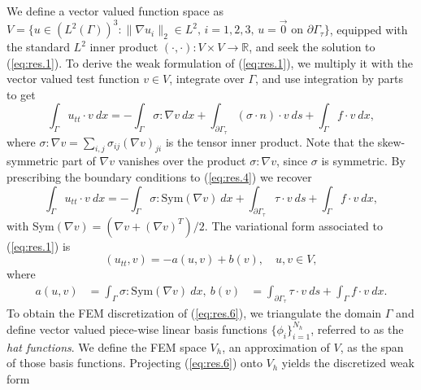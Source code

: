 We define a vector valued function space as $V = \{ u \in (L^2(\Gamma))^3 : \| \nabla u_i \|_2 \in L^2 \text{, } i=1,2,3\text{, } u = \vec 0 \text{ on } \partial \Gamma_\tau \}$, equipped with the standard $L^2$ inner product $(\cdot,\cdot):V\times V \to \mathbb R$, and seek the solution to (\ref{eq:res.1}). To derive the weak formulation of (\ref{eq:res.1}), we multiply it with the vector valued test function $v \in V$, integrate over $\Gamma$, and use integration by parts to get 
\begin{equation}  \label{eq:res.4}
	\int_{\Gamma} u_{tt} \cdot v\ dx = - \int_{\Gamma} \sigma : \nabla v \ dx+ \int_{\partial \Gamma_\tau} (\sigma \cdot n) \cdot v\ ds +  \int_{\Gamma} f \cdot v \ dx,
\end{equation}
where $\sigma : \nabla v = \sum_{i,j}\sigma_{ij}(\nabla v)_{ji}$ is the tensor inner product. Note that the skew-symmetric part of $\nabla v$ vanishes over the product $\sigma : \nabla v$, since $\sigma$ is symmetric. By prescribing the boundary conditions to (\ref{eq:res.4}) we recover
\begin{equation} \label{eq:res.5}
	\int_{\Gamma} u_{tt} \cdot v\ dx = - \int_{\Gamma} \sigma : \text{Sym}(\nabla v) \ dx+ \int_{\partial \Gamma_\tau} \tau \cdot v\ ds +  \int_{\Gamma} f \cdot v \ dx,
\end{equation}
with Sym$(\nabla v) = (\nabla v + (\nabla v)^T)/2$. The variational form associated to (\ref{eq:res.1}) is
\begin{equation} \label{eq:res.6}
	(u_{tt},v) = - a(u,v) + b(v), \quad u,v\in V,
\end{equation}
where
\begin{equation} \label{eq:res.7}
\begin{aligned}
	a(u,v) &= \int_{\Gamma} \sigma : \text{Sym}(\nabla v) \ dx, ~
	b(v) &= \int_{\partial \Gamma_\tau} \tau \cdot v\ ds +  \int_{\Gamma} f \cdot v \ dx.
\end{aligned}
\end{equation}
To obtain the FEM discretization of (\ref{eq:res.6}), we triangulate the domain $\Gamma$ and define vector valued piece-wise linear basis functions $\{\phi_i\}_{i=1}^{N_h}$, referred to as the \emph{hat functions}. We define the FEM space $V_h$, an approximation of $V$, as the span of those basis functions. Projecting (\ref{eq:res.6}) onto $V_h$ yields the discretized weak form
